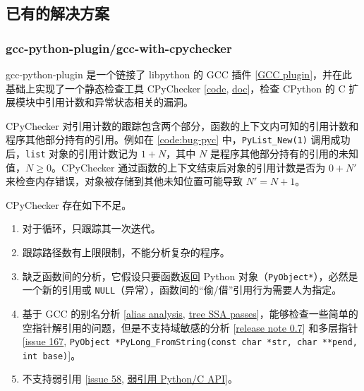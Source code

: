 \subsection{已有的解决方案}

\subsubsection{gcc-python-plugin/gcc-with-cpychecker}

gcc-python-plugin 是一个链接了 libpython 的 GCC 插件 [\href{https://gcc.gnu.org/onlinedocs/gccint/Plugins.html}{GCC plugin}]，并在此基础上实现了一个静态检查工具 CPyChecker [\href{https://github.com/davidmalcolm/gcc-python-plugin/blob/master/gcc-with-cpychecker}{code}, \href{https://gcc-python-plugin.readthedocs.io/en/latest/cpychecker.html}{doc}]，检查 CPython 的 C 扩展模块中引用计数和异常状态相关的漏洞。

CPyChecker 对引用计数的跟踪包含两个部分，函数的上下文内可知的引用计数和程序其他部分持有的引用。例如在 \autoref{code:bug-pyc} 中，\texttt{PyList\_New(1)} 调用成功后，\texttt{list} 对象的引用计数记为 $1+N$，其中 $N$ 是程序其他部分持有的引用的未知值，$N \ge 0$。CPyChecker 通过函数的上下文结束后对象的引用计数是否为 $0 + N'$ 来检查内存错误，对象被存储到其他未知位置可能导致 $N' = N + 1$。

CPyChecker 存在如下不足。

\begin{enumerate}
\item 对于循环，只跟踪其一次迭代。
\item 跟踪路径数有上限限制，不能分析复杂的程序。
\item 缺乏函数间的分析，它假设只要函数返回 Python 对象（\texttt{PyObject*}），必然是一个新的引用或 \texttt{NULL}（异常），函数间的“偷/借”引用行为需要人为指定。
\item 基于 GCC 的别名分析 [\href{https://gcc.gnu.org/onlinedocs/gccint/Alias-analysis.html}{alias analysis}, \href{https://gcc.gnu.org/onlinedocs/gccint/Tree-SSA-passes.html}{tree SSA passes}]，能够检查一些简单的空指针解引用的问题，但是不支持域敏感的分析 [\href{https://gcc-python-plugin.readthedocs.io/en/latest/0.7.html#signal-noise-ratio-improvements}{release note 0.7}] 和多层指针 [\href{https://github.com/davidmalcolm/gcc-python-plugin/issues/167}{issue 167}, \texttt{PyObject *PyLong\_FromString(const char *str, char **pend, int base)}]。
\item 不支持弱引用 [\href{https://github.com/davidmalcolm/gcc-python-plugin/issues/58}{issue 58}, \href{https://docs.python.org/3/c-api/weakref.html}{弱引用 Python/C API}]。
\end{enumerate}

